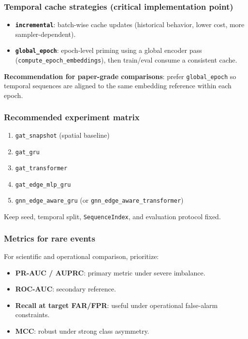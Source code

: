 \subsubsection{Temporal cache strategies (critical implementation point)}
\begin{itemize}[leftmargin=*]
  \item \textbf{\texttt{incremental}}: batch-wise cache updates (historical behavior, lower cost, more sampler-dependent).
  \item \textbf{\texttt{global\_epoch}}: epoch-level priming using a global encoder pass (\texttt{compute\_epoch\_embeddings}), then train/eval consume a consistent cache.
\end{itemize}
\textbf{Recommendation for paper-grade comparisons}: prefer \texttt{global\_epoch}
so temporal sequences are aligned to the same embedding reference within each epoch.

\subsubsection{Recommended experiment matrix}
\begin{enumerate}[leftmargin=*]
  \item \texttt{gat\_snapshot} (spatial baseline)
  \item \texttt{gat\_gru}
  \item \texttt{gat\_transformer}
  \item \texttt{gat\_edge\_mlp\_gru}
  \item \texttt{gnn\_edge\_aware\_gru} (or \texttt{gnn\_edge\_aware\_transformer})
\end{enumerate}
Keep seed, temporal split, \texttt{SequenceIndex}, and evaluation protocol fixed.

\subsubsection{Metrics for rare events}
For scientific and operational comparison, prioritize:
\begin{itemize}[leftmargin=*]
  \item \textbf{PR-AUC / AUPRC}: primary metric under severe imbalance.
  \item \textbf{ROC-AUC}: secondary reference.
  \item \textbf{Recall at target FAR/FPR}: useful under operational false-alarm constraints.
  \item \textbf{MCC}: robust under strong class asymmetry.
\end{itemize}

